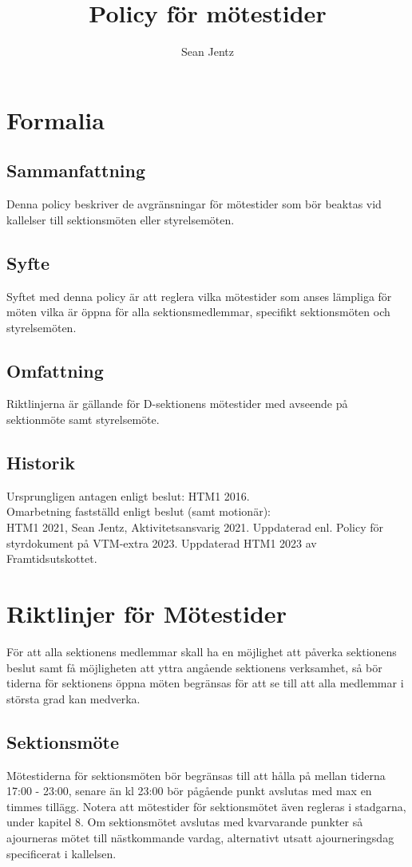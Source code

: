 \documentclass[]{dsekprotokoll}
\title{Policy för mötestider}
\author{Sean Jentz}
\begin{document}
\maketitle

\section{Formalia}

\subsection{Sammanfattning}
Denna policy beskriver de avgränsningar för mötestider som bör
beaktas vid kallelser till sektionsmöten eller styrelsemöten.

\subsection{Syfte}
Syftet med denna policy är att reglera vilka mötestider som anses
lämpliga för möten vilka är öppna för alla sektionsmedlemmar,
specifikt sektionsmöten och styrelsemöten.

\subsection{Omfattning}
Riktlinjerna är gällande för D-sektionens mötestider med avseende på
sektionmöte samt styrelsemöte.

\subsection{Historik}
Ursprungligen antagen enligt beslut: HTM1 2016. \\
Omarbetning fastställd enligt beslut (samt motionär): \\
HTM1 2021, Sean Jentz, Aktivitetsansvarig 2021.
Uppdaterad enl. Policy för styrdokument på VTM-extra 2023.
Uppdaterad HTM1 2023 av Framtidsutskottet.

\section{Riktlinjer för Mötestider}
För att alla sektionens medlemmar skall ha en möjlighet att påverka
sektionens beslut samt få möjligheten att yttra angående sektionens
verksamhet, så bör tiderna för sektionens öppna möten begränsas för
att se till att alla medlemmar i största grad kan medverka.

\subsection{Sektionsmöte}
Mötestiderna för sektionsmöten bör begränsas till att hålla på mellan
tiderna 17:00 -
23:00, senare än kl 23:00 bör pågående punkt avslutas med max en timmes tillägg.
Notera att mötestider för sektionsmötet även regleras i stadgarna,
under kapitel 8. Om sektionsmötet avslutas med kvarvarande punkter så
ajourneras mötet till nästkommande vardag, alternativt utsatt
ajourneringsdag specificerat i kallelsen.
\end{document}
